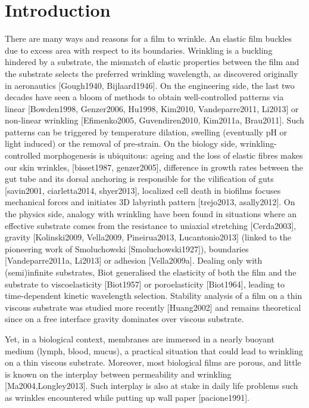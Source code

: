 \documentclass[twocolumn,superscriptaddress,showpacs,preprintnumbers,
amsmath,amssymb,prl]{revtex4-1}
\begin{document}
\section*{Introduction}
There are many ways and reasons for a film to wrinkle. An elastic film buckles due to excess area with respect to its boundaries. Wrinkling is a buckling hindered by a substrate, the mismatch of elastic properties between the film and the substrate selects the preferred wrinkling wavelength, as discovered originally in aeronautics [Gough1940, Bijlaard1946]. On the engineering side, the last two decades have seen a bloom of methods to obtain well-controlled patterns via linear [Bowden1998, Genzer2006, Hu1998, Kim2010, Vandeparre2011, Li2013] or non-linear wrinkling [Efimenko2005, Guvendiren2010, Kim2011a, Brau2011]. Such patterns can be triggered by temperature dilation, swelling (eventually pH or light induced) or the removal of pre-strain. On the biology side, wrinkling-controlled morphogenesis is ubiquitous: ageing and the loss of elastic fibres makes our skin wrinkles, [bisset1987, genzer2005], difference in growth rates between the gut tube and its dorsal anchoring is responsible for the vilification of guts [savin2001, ciarletta2014, shyer2013], localized cell death in biofilms focuses mechanical forces and initiates 3D labyrinth pattern [trejo2013, asally2012]. On the physics side, analogy with wrinkling have been found in situations where an effective substrate comes from the resistance to uniaxial stretching [Cerda2003], gravity [Kolinski2009, Vella2009, Pineirua2013, Lucantonio2013] (linked to the pioneering work of Smoluchowski [Smoluchowski1927]), boundaries [Vandeparre2011a, Li2013] or adhesion [Vella2009a]. Dealing only with (semi)infinite substrates, Biot generalised the elasticity of both the film and the substrate to viscoelasticity [Biot1957] or poroelasticity [Biot1964], leading to time-dependent kinetic wavelength selection. Stability analysis of a film on a thin viscous substrate was studied more recently [Huang2002] and remains theoretical since on a free interface gravity dominates over viscous substrate.



Yet, in a biological context, membranes are immersed in a nearly buoyant medium (lymph, blood, mucus), a practical situation that could lead to wrinkling on a thin viscous substrate. Moreover, most biological films are porous, and little is known on the interplay between permeability and wrinkling [Ma2004,Longley2013]. Such interplay is also at stake in daily life problems such as wrinkles encountered while putting up wall paper [pacione1991].
\end{document}
